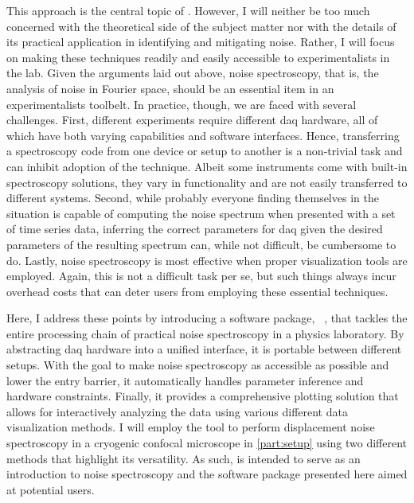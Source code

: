 This approach is the central topic of \thispart.
However, I will neither be too much concerned with the theoretical side of the subject matter nor with the details of its practical application in identifying and mitigating noise.
Rather, I will focus on making these techniques readily and easily accessible to experimentalists in the lab.
Given the arguments laid out above, noise spectroscopy, that is, the analysis of noise in Fourier space, should be an essential item in an experimentalists toolbelt.
In practice, though, we are faced with several challenges.
First, different experiments require different \gls{daq} hardware, all of which have both varying capabilities and software interfaces.
Hence, transferring a spectroscopy code from one device or setup to another is a non-trivial task and can inhibit adoption of the technique.
Albeit some instruments come with built-in spectroscopy solutions, they vary in functionality and are not easily transferred to different systems.
Second, while probably everyone finding themselves in the situation is capable of computing the noise spectrum when presented with a set of time series data, inferring the correct parameters for \acrlong{daq} given the desired parameters of the resulting spectrum can, while not difficult, be cumbersome to do.
Lastly, noise spectroscopy is most effective when proper visualization tools are employed.
Again, this is not a difficult task per se, but such things always incur overhead costs that can deter users from employing these essential techniques.

Here, I address these points by introducing a \python software package, \pyspeck~\cite{Hangleiter_pyspeck}, that tackles the entire processing chain of practical noise spectroscopy in a physics laboratory.
By abstracting \gls{daq} hardware into a unified interface, it is portable between different setups.
With the goal to make noise spectroscopy as accessible as possible and lower the entry barrier, it automatically handles parameter inference and hardware constraints.
Finally, it provides a comprehensive plotting solution that allows for interactively analyzing the data using various different data visualization methods.
I will employ the tool to perform displacement noise spectroscopy in a cryogenic confocal microscope in \cref{part:setup} using two different methods that highlight its versatility.
As such, \thispart is intended to serve as an introduction to noise spectroscopy and the \pyspeck software package presented here aimed at potential users.

